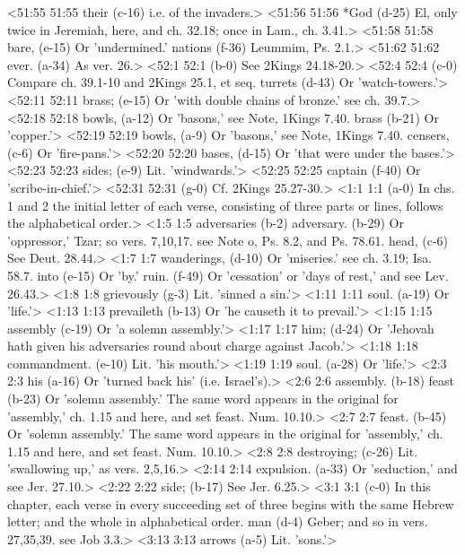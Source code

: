 <51:55 51:55  their (c-16)  i.e. of the invaders.>
<51:56 51:56  *God (d-25)  El, only twice in Jeremiah, here, and ch. 32.18; once in  Lam., ch. 3.41.>
<51:58 51:58  bare, (e-15)  Or 'undermined.'
  nations (f-36)  Leummim, Ps. 2.1.>
<51:62 51:62  ever. (a-34)  As ver. 26.>
<52:1 52:1   (b-0)  See 2Kings 24.18-20.>
<52:4 52:4   (c-0)  Compare ch. 39.1-10 and 2Kings 25.1, et seq.
  turrets (d-43)  Or 'watch-towers.'>
<52:11 52:11  brass; (e-15)  Or 'with double chains of bronze.' see ch. 39.7.>
<52:18 52:18  bowls, (a-12)  Or 'basons,' see Note, 1Kings 7.40.
  brass (b-21)  Or 'copper.'>
<52:19 52:19  bowls, (a-9)  Or 'basons,' see Note, 1Kings 7.40.
  censers, (c-6)  Or 'fire-pans.'>
<52:20 52:20  bases, (d-15)  Or 'that were under the bases.'>
<52:23 52:23  sides; (e-9)  Lit. 'windwards.'>
<52:25 52:25  captain (f-40)  Or 'scribe-in-chief.'>
<52:31 52:31   (g-0)  Cf. 2Kings 25.27-30.>
<1:1 1:1   (a-0)  In chs. 1 and 2 the initial letter of each verse, consisting  of three parts or lines, follows the alphabetical order.>
<1:5 1:5  adversaries (b-2)  adversary. (b-29)
  Or 'oppressor,' Tzar; so vers. 7,10,17. see Note o, Ps. 8.2, and Ps. 78.61.
  head, (c-6)  See Deut. 28.44.>
<1:7 1:7  wanderings, (d-10)  Or 'miseries.' see ch. 3.19; Isa. 58.7.
  into (e-15)  Or 'by.'
  ruin. (f-49)  Or 'cessation' or 'days of rest,' and see Lev. 26.43.>
<1:8 1:8  grievously (g-3)  Lit. 'sinned a sin.'>
<1:11 1:11  soul. (a-19) Or 'life.'>
<1:13 1:13  prevaileth (b-13)  Or 'he causeth it to prevail.'>
<1:15 1:15  assembly (c-19)  Or 'a solemn assembly.'>
<1:17 1:17  him; (d-24)  Or 'Jehovah hath given his adversaries round about charge  against Jacob.'>
<1:18 1:18  commandment. (e-10)  Lit. 'his mouth.'>
<1:19 1:19  soul. (a-28)  Or 'life.'>
<2:3 2:3  his (a-16)  Or 'turned back his' (i.e. Israel's).>
<2:6 2:6  assembly. (b-18)  feast (b-23)
 Or 'solemn assembly.' The same word appears in the original for 'assembly,' ch. 1.15 and here, and set feast. Num. 10.10.>
<2:7 2:7  feast. (b-45)  Or 'solemn assembly.' The same word appears in the original  for 'assembly,' ch. 1.15 and here, and set feast. Num. 10.10.>
<2:8 2:8  destroying; (c-26)  Lit. 'swallowing up,' as vers. 2,5,16.>
<2:14 2:14  expulsion. (a-33)  Or 'seduction,' and see Jer. 27.10.>
<2:22 2:22  side; (b-17)  See Jer. 6.25.>
<3:1 3:1   (c-0)  In this chapter, each verse in every succeeding set of three  begins with the same Hebrew letter; and the whole in  alphabetical order.
  man (d-4)  Geber; and so in vers. 27,35,39. see Job 3.3.>
<3:13 3:13  arrows (a-5)  Lit. 'sons.'>
